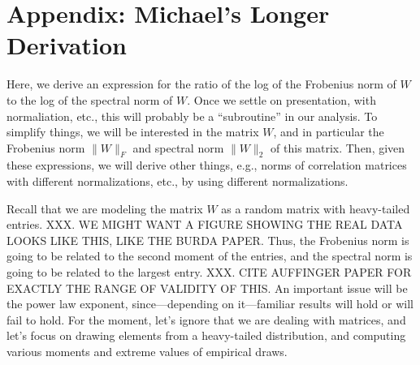 {{ }


{ \iffalse 

\newpage
\section{Appendix: Michael's Longer Derivation}
\label{sxn:appendix-michael_derivation}


Here, we derive an expression for the ratio of the log of the Frobenius norm of $W$ to the log of the spectral norm of $W$.
Once we settle on presentation, with normaliation, etc., this will probably be a ``subroutine'' in our analysis.
To simplify things, we will be interested in the matrix $W$, and in particular the Frobenius norm $\|W\|_F$ and spectral norm $\|W\|_2$ of this matrix.
Then, given these expressions, we will derive other things, e.g., norms of correlation matrices with different normalizations, etc., by using different normalizations.  

Recall that we are modeling the matrix $W$ as a random matrix with heavy-tailed entries.
XXX.  WE MIGHT WANT A FIGURE SHOWING THE REAL DATA LOOKS LIKE THIS, LIKE THE BURDA PAPER.
Thus, the Frobenius norm is going to be related to the second moment of the entries, and the spectral norm is going to be related to the largest entry.
XXX.  CITE AUFFINGER PAPER FOR EXACTLY THE RANGE OF VALIDITY OF THIS.
An important issue will be the power law exponent, since---depending on it---familiar results will hold or will fail to hold.
For the moment, let's ignore that we are dealing with matrices, and let's focus on drawing elements from a heavy-tailed distribution, and computing various moments and extreme values of empirical draws.

}}
